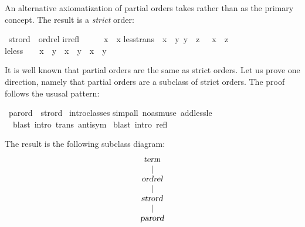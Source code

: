 \begin{isabellebody}
%
%
\begin{isamarkuptext}%
An alternative axiomatization of partial orders takes \isa{{\isacharless}{\isacharless}} rather than
\isa{{\isacharless}{\isacharless}{\isacharequal}} as the primary concept. The result is a \emph{strict} order:%
\end{isamarkuptext}%
\ strord\ {\isacharless}\ ordrel\isanewline
irrefl{\isacharcolon}\ \ \ \ \ {\isachardoublequote}{\isasymnot}\ x\ {\isacharless}{\isacharless}\ x{\isachardoublequote}\isanewline
less{\isacharunderscore}trans{\isacharcolon}\ {\isachardoublequote}{\isasymlbrakk}\ x\ {\isacharless}{\isacharless}\ y{\isacharsemicolon}\ y\ {\isacharless}{\isacharless}\ z\ {\isasymrbrakk}\ {\isasymLongrightarrow}\ x\ {\isacharless}{\isacharless}\ z{\isachardoublequote}\isanewline
le{\isacharunderscore}less{\isacharcolon}\ \ \ \ {\isachardoublequote}x\ {\isacharless}{\isacharless}{\isacharequal}\ y\ {\isacharequal}\ {\isacharparenleft}x\ {\isacharless}{\isacharless}\ y\ {\isasymor}\ x\ {\isacharequal}\ y{\isacharparenright}{\isachardoublequote}%
\begin{isamarkuptext}%
\noindent
It is well known that partial orders are the same as strict orders. Let us
prove one direction, namely that partial orders are a subclass of strict
orders. The proof follows the ususal pattern:%
\end{isamarkuptext}%
\ parord\ {\isacharless}\ strord\isanewline
{}\ intro{\isacharunderscore}classes\isanewline
{}simp{\isacharunderscore}all\ {\isacharparenleft}no{\isacharunderscore}asm{\isacharunderscore}use{\isacharparenright}\ add{\isacharcolon}less{\isacharunderscore}le{\isacharparenright}\isanewline
\ \ blast\ intro{\isacharcolon}\ trans\ antisym{\isacharparenright}\isanewline
\ blast\ intro{\isacharcolon}\ refl{\isacharparenright}\isanewline
{}%
\begin{isamarkuptext}%
\noindent
The result is the following subclass diagram:
\[
\begin{array}{c}
\emph{\sl term}\\
|\\
\emph{\sl ordrel}\\
|\\
\emph{\sl strord}\\
|\\
\emph{\sl parord}
\end{array}
\]


\end{isamarkuptext}
\end{isabellebody}
